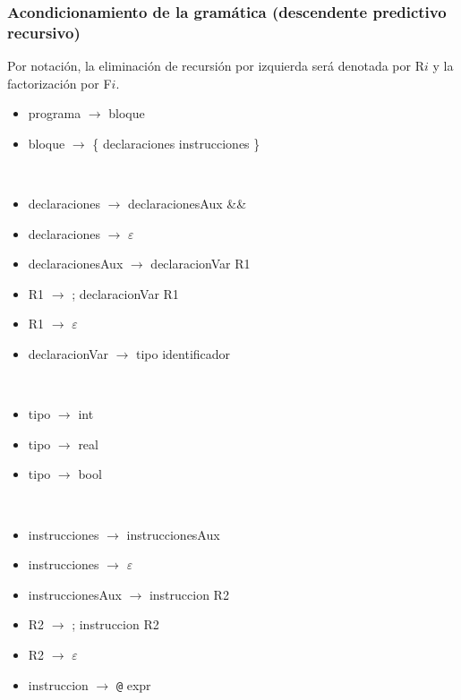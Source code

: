 \documentclass[11pt]{article}
\begin{document}
            \subsubsection{Acondicionamiento de la gramática (descendente predictivo recursivo)}
            Por notación, la eliminación de recursión por izquierda será denotada por R$i$ y la factorización por F$i$.  
            \begin{itemize}
                \item programa $\rightarrow$ bloque
                \item bloque $\rightarrow$ \{ declaraciones instrucciones \}
            \end{itemize}
            \
            \begin{itemize}
                \item declaraciones $\rightarrow$ declaracionesAux \&\&
                \item declaraciones $\rightarrow$ $\varepsilon$
                \item declaracionesAux $\rightarrow$ declaracionVar R1
                \item R1 $\rightarrow$ ; declaracionVar R1
                \item R1 $\rightarrow$ $\varepsilon$
                \item declaracionVar $\rightarrow$ tipo identificador
            \end{itemize}
            \ 
            \begin{itemize}
                \item tipo $\rightarrow$ int
                \item tipo $\rightarrow$ real
                \item tipo $\rightarrow$ bool
            \end{itemize}
            \ 
            \begin{itemize}
                \item instrucciones $\rightarrow$ instruccionesAux
                \item instrucciones $\rightarrow$ $\varepsilon$
                \item instruccionesAux $\rightarrow$ instruccion R2
                \item R2 $\rightarrow$ ; instruccion R2
                \item R2 $\rightarrow$ $\varepsilon$ 
                \item instruccion $\rightarrow$ \verb|@| expr 
            \end{itemize}
\end{document}
